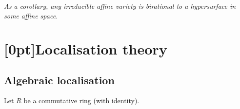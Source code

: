 \documentclass[10pt]{article}
\newcommand{\AG}{\textcolor{green}{AG}}
\begin{document}

        \emph{As a corollary, any irreducible \emph{affine} variety is birational to a hypersurface in some \emph{affine} space.}

    \section{\protect\marginnote{\AG}[0pt]Localisation theory}

        \subsection{Algebraic localisation}

            Let $R$ be a commutative ring (with identity).
\end{document}
